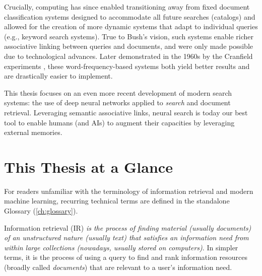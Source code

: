 Crucially, computing has since enabled transitioning away from fixed document classification systems designed to accommodate all future searches (catalogs) and allowed for the creation of more dynamic systems that adapt to individual queries (e.g., keyword search systems). True to Bush's vision, such systems enable richer associative linking between queries and documents, and were only made possible due to technological advances. Later demonstrated in the 1960s by the Cranfield experiments  , these word-frequency-based systems both yield better results and are drastically easier to implement.


This thesis focuses on an even more recent development of modern search systems: the use of deep neural networks applied to \textit{search} and document retrieval. Leveraging semantic associative links, neural search is today our best tool to enable humans (and AIs) to augment their capacities by leveraging external memories.




\section{This Thesis at a Glance}

For readers unfamiliar with the terminology of information retrieval and modern machine learning, recurring technical terms are defined in the standalone Glossary (\autoref{ch:glossary}).

Information retrieval (IR) \emph{is the process of finding material (usually documents) of an unstructured nature (usually text) that satisfies an information need from within large collections (nowadays, usually stored on computers)}. In simpler terms, it is the process of using a query to find and rank information resources (broadly called \emph{documents}) that are relevant to a user’s information need.


